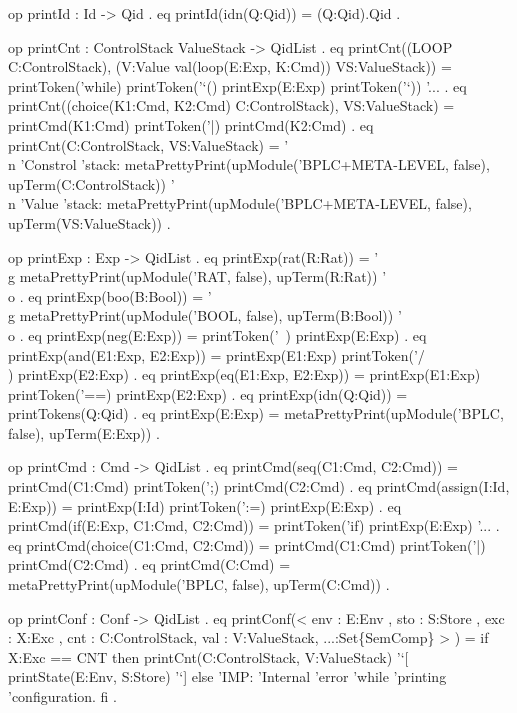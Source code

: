 \documentclass{llncs}%
\begin{document}
 op printId : Id -> Qid .
 eq printId(idn(Q:Qid)) = (Q:Qid).Qid .
 
 op printCnt : ControlStack ValueStack -> QidList .
 eq printCnt((LOOP C:ControlStack), 
             (V:Value val(loop(E:Exp, K:Cmd)) VS:ValueStack)) =
    printToken('while) printToken('`() printExp(E:Exp) printToken('`)) '... .
 eq printCnt((choice(K1:Cmd, K2:Cmd) C:ControlStack), VS:ValueStack) =
    printCmd(K1:Cmd) printToken('|) printCmd(K2:Cmd) .
 eq printCnt(C:ControlStack, VS:ValueStack) =
    '\\n 'Constrol 'stack:
    metaPrettyPrint(upModule('BPLC+META-LEVEL, false),
     upTerm(C:ControlStack))
    '\\n 'Value 'stack:
     metaPrettyPrint(upModule('BPLC+META-LEVEL, false),
     upTerm(VS:ValueStack)) .

 op printExp : Exp -> QidList .
 eq printExp(rat(R:Rat)) = '\\g metaPrettyPrint(upModule('RAT, false),
     upTerm(R:Rat)) '\\o .
 eq printExp(boo(B:Bool)) = '\\g metaPrettyPrint(upModule('BOOL, false),
     upTerm(B:Bool)) '\\o .
 eq printExp(neg(E:Exp)) = printToken('~) printExp(E:Exp) .
 eq printExp(and(E1:Exp, E2:Exp)) = 
    printExp(E1:Exp) printToken('/\\) printExp(E2:Exp) .
 eq printExp(eq(E1:Exp, E2:Exp)) = 
    printExp(E1:Exp) printToken('==) printExp(E2:Exp) .
 eq printExp(idn(Q:Qid)) = printTokens(Q:Qid) .
 eq printExp(E:Exp) = metaPrettyPrint(upModule('BPLC, false), upTerm(E:Exp)) .

 op printCmd : Cmd -> QidList .
 eq printCmd(seq(C1:Cmd, C2:Cmd)) = 
    printCmd(C1:Cmd) printToken(';) printCmd(C2:Cmd) .
 eq printCmd(assign(I:Id, E:Exp)) = 
    printExp(I:Id) printToken(':=) printExp(E:Exp) .
 eq printCmd(if(E:Exp, C1:Cmd, C2:Cmd)) = 
    printToken('if) printExp(E:Exp) '... .
 eq printCmd(choice(C1:Cmd, C2:Cmd)) = printCmd(C1:Cmd)
    printToken('|) printCmd(C2:Cmd) .
 eq printCmd(C:Cmd) = metaPrettyPrint(upModule('BPLC, false), upTerm(C:Cmd)) .

 op printConf : Conf -> QidList .
 eq printConf(< env : E:Env , sto : S:Store , exc : X:Exc , 
                cnt : C:ControlStack, val : V:ValueStack, ...:Set\{SemComp\} > ) =
    if X:Exc == CNT
    then printCnt(C:ControlStack, V:ValueStack) '`[ printState(E:Env, S:Store) '`]
        else 'IMP: 'Internal 'error 'while 'printing 'configuration.  
    fi .
\end{document}
